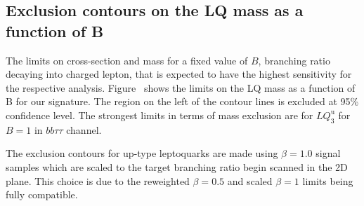 \subsection{Exclusion contours on the LQ mass as a function of B}

The limits on cross-section and mass for a fixed value of $B$, branching ratio decaying into charged lepton, that is expected 
to have the highest sensitivity for the respective analysis.  Figure~ shows the limits on the LQ mass as a function of B for our signature. 
The region on the left of the contour lines is excluded at 95\% confidence level. 
The strongest limits in terms of mass exclusion are for $LQ_3^{\mathrm{u}}$ for $B=1$ in $bb\tau\tau$ channel. 

The exclusion contours for up-type leptoquarks are made using $\beta = 1.0$ signal samples which are scaled to the target branching 
ratio begin scanned in the 2D plane. This choice is due to the reweighted $\beta=0.5$ and scaled $\beta=1$ limits being fully compatible.
